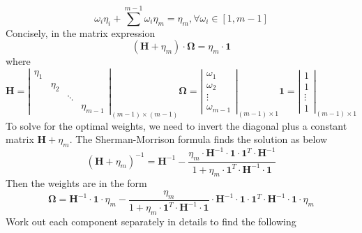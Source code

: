 \documentclass{article}
\begin{document}
\begin{equation}
    \omega_i \eta_i + \sum^{m - 1}{\omega_i} \eta_m = \eta_m, \forall \omega_i \in [1, m - 1]
\end{equation}
Concisely, in the matrix expression
\begin{equation}
    \left(\boldsymbol{H} + \eta_m\right) \cdot \boldsymbol{\Omega} = \eta_m \cdot \boldsymbol{1}
\end{equation}
where
\begin{equation}
    \boldsymbol{H} = \left| \begin{matrix} \eta_1 & & & \\ & \eta_2 & & \\ & & \ddots & \\ & & & \eta_{m- 1} \end{matrix} \right |_{(m - 1) \times (m - 1)} \boldsymbol{\Omega} = \left| \begin{matrix} \omega_1 \\ \omega_2 \\ \vdots \\ \omega_{m - 1} \end{matrix} \right|_{(m - 1) \times 1} \boldsymbol{1} = \left| \begin{matrix} 1 \\ 1 \\ \vdots \\ 1 \end{matrix} \right|_{(m - 1) \times 1} \nonumber
\end{equation}
To solve for the optimal weights, we need to invert the diagonal plus a constant matrix $ \boldsymbol{H} + \eta_m $. The Sherman-Morrison formula finds the solution as below
\begin{equation}
    \left( \boldsymbol{H} + \eta_m \right)^{-1} = \boldsymbol{H}^{-1} - \frac{\eta_m \cdot \boldsymbol{H}^{-1} \cdot \boldsymbol{1} \cdot \boldsymbol{1}^T \cdot \boldsymbol{H}^{-1}}{1 + \eta_m \cdot \boldsymbol{1}^{T} \cdot \boldsymbol{H}^{-1} \cdot \boldsymbol{1}}
\end{equation}
Then the weights are in the form
\begin{equation}
    \boldsymbol{\Omega} = \boldsymbol{H}^{-1} \cdot \boldsymbol{1} \cdot \eta_m - \frac{\eta_m}{1 + \eta_m \cdot \boldsymbol{1}^{T} \cdot \boldsymbol{H}^{-1} \cdot \boldsymbol{1}} \cdot \boldsymbol{H}^{-1} \cdot \boldsymbol{1} \cdot \boldsymbol{1}^{T} \cdot \boldsymbol{H}^{-1} \cdot \boldsymbol{1} \cdot \eta_m
\end{equation}
Work out each component separately in details to find the following
\end{document}
